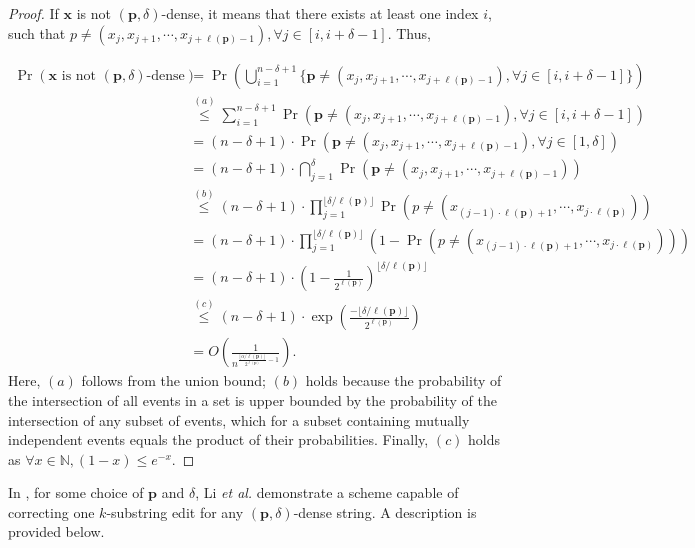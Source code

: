 \documentclass[onecolumn]{IEEEtran}
\newcommand{\bl}{n}
\newcommand{\editsize}{k}
\newcommand{\length}[1]{{\ell}(#1)}
\newcommand{\bfp}{{\mathbf{ p}}}
\newcommand{\vr}[1]{{\color{red} {\small [VR: #1]} }}
\begin{document}
\begin{proof}
 If $\mathbf{x}$ is not $(\mathbf{p}, \delta)$-dense, it means that there exists at least one index $i$, such that $p\neq(x_j,x_{j+1}, \cdots, x_{j+\length{\mathbf{p}}-1}), \forall j \in [i,i+\delta-1]$. Thus,
 
    \begin{align*}
        \Pr(\mathbf{x} \text{ is not } (\mathbf{p}, \delta)\text{-dense}) &=  \Pr\left(\bigcup_{i=1}^{\bl-\delta+1} \{\bfp\neq(x_j,x_{j+1}, \cdots, x_{j+\length{\mathbf{p}}-1}), \forall j \in [i,i+\delta-1]\}\right)\\
        &\stackrel{(a)}{\leq}  \sum_{i=1}^{\bl-\delta+1} \Pr\left(\mathbf{p}\neq(x_j,x_{j+1}, \cdots, x_{j+\length{\mathbf{p}}-1}), \forall j \in [i,i+\delta-1]\right)\\
        &= (\bl-\delta+1)\cdot\Pr\left(\mathbf{p}\neq(x_j,x_{j+1}, \cdots, x_{j+\length{\mathbf{p}}-1}), \forall j \in [1,\delta]\right)\\
        &=(\bl-\delta+1)\cdot\bigcap_{j=1}^{\delta}\Pr(\mathbf{p}\neq(x_j,x_{j+1}, \cdots, x_{j+\length{\mathbf{p}}-1}))\\
        &\stackrel{(b)}{\leq} (\bl-\delta+1)\cdot\prod_{j=1}^{\lfloor\delta/\length{\mathbf{p}}\rfloor}\Pr(p\neq(x_{(j-1)\cdot\length{\mathbf{p}}+1}, \cdots, x_{j\cdot\length{\mathbf{p}}}))\\
        &=  (\bl-\delta+1)\cdot \prod_{j=1}^{\lfloor\delta/\length{\mathbf{p}}\rfloor}(1-\Pr(p\neq(x_{(j-1)\cdot\length{\mathbf{p}}+1}, \cdots, x_{j\cdot\length{\mathbf{p}}})))\\
        &= (\bl-\delta+1)\cdot \left(1-\frac{1}{2^{\length{\mathbf{p}}}}\right)^{\lfloor\delta/\length{\mathbf{p}}\rfloor}\\
        &\stackrel{(c)}{\leq} (\bl-\delta+1)\cdot \exp\left(\frac{-\lfloor\delta/\length{\mathbf{p}}\rfloor}{2^{\length{\mathbf{p}}}}\right)\\
        &= O\left(\frac{1}{n^{\frac{\lfloor\alpha/\length{\mathbf{p}}\rfloor}{2^{\length{\mathbf{p}}}}-1}}\right).
    \end{align*}
Here, $(a)$ follows from the union bound; $(b)$ holds because the probability of the intersection of all events in a set is upper bounded by the probability of the intersection of any subset of events, which for a subset containing mutually independent events equals the product of their probabilities. Finally, $(c)$ holds as $\forall x \in \mathbb{N}, (1-x)\leq e^{-x}$.
\end{proof}
In \cite{Li_Optimal_one_substring_error}, for some choice of $\bfp$ and $\delta$, Li \emph{et al.} demonstrate a scheme capable of correcting one $\editsize$-substring edit for any $(\mathbf{p}, \delta)$-dense string. A description is provided below.
\end{document}

